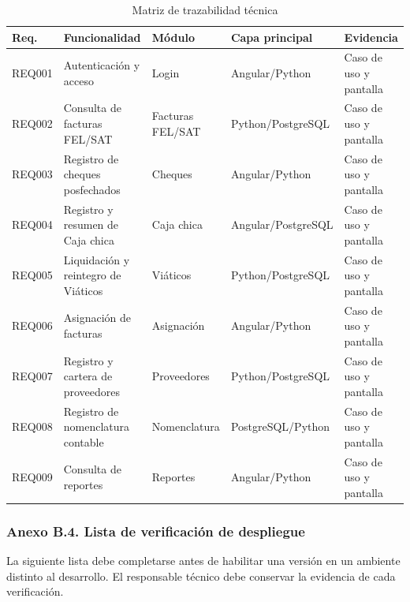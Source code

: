 \begin{longtable}{p{1.5cm}p{4.0cm}p{3.1cm}p{3.0cm}p{2.0cm}}
\caption{Matriz de trazabilidad técnica}\label{tab:B_trazabilidad_tecnica}\\
\toprule
\textbf{Req.} & \textbf{Funcionalidad} & \textbf{Módulo} & \textbf{Capa principal} & \textbf{Evidencia}\\
\midrule
REQ001 & Autenticación y acceso & Login & Angular/Python & Caso de uso y pantalla\\
REQ002 & Consulta de facturas FEL/SAT & Facturas FEL/SAT & Python/PostgreSQL & Caso de uso y pantalla\\
REQ003 & Registro de cheques posfechados & Cheques & Angular/Python & Caso de uso y pantalla\\
REQ004 & Registro y resumen de Caja chica & Caja chica & Angular/PostgreSQL & Caso de uso y pantalla\\
REQ005 & Liquidación y reintegro de Viáticos & Viáticos & Python/PostgreSQL & Caso de uso y pantalla\\
REQ006 & Asignación de facturas & Asignación & Angular/Python & Caso de uso y pantalla\\
REQ007 & Registro y cartera de proveedores & Proveedores & Python/PostgreSQL & Caso de uso y pantalla\\
REQ008 & Registro de nomenclatura contable & Nomenclatura & PostgreSQL/Python & Caso de uso y pantalla\\
REQ009 & Consulta de reportes & Reportes & Angular/Python & Caso de uso y pantalla\\
\bottomrule
\end{longtable}

\subsubsection{Anexo B.4. Lista de verificación de despliegue}
La siguiente lista debe completarse antes de habilitar una versión en un ambiente distinto al desarrollo. El responsable técnico debe conservar la evidencia de cada verificación.

